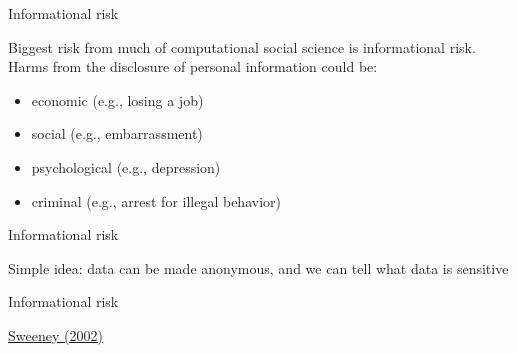\documentclass{beamer}
\begin{document}
\begin{frame}{Informational risk}

Biggest risk from much of computational social science is informational risk.  Harms from the disclosure of personal information could be: 

\begin{itemize}
\item economic (e.g., losing a job)
\item social (e.g., embarrassment)
\item psychological (e.g., depression)
\item criminal (e.g., arrest for illegal behavior)
\end{itemize}

\end{frame}
\begin{frame}{Informational risk}

Simple idea: data can be made anonymous, and we can tell what data is sensitive

\end{frame}
\begin{frame}{Informational risk}

\begin{center}
\end{center}

\vfill
\href{http://dx.doi.org/10.1142/S0218488502001648}{Sweeney (2002)}

\end{frame}
\end{document}
